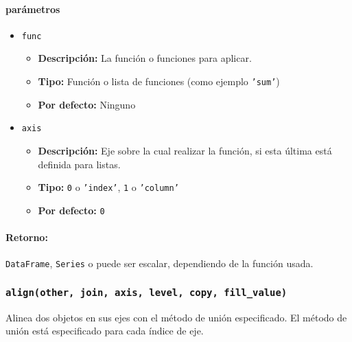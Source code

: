         \paragraph{\textbf{parámetros}}
        \begin{itemize}
            \item \texttt{func}
                \begin{itemize}
                    \item \textbf{Descripción:} La función o funciones para aplicar.
                    \item \textbf{Tipo:} Función o lista de funciones (como ejemplo \texttt{'sum'})
                    \item \textbf{Por defecto:} Ninguno
                \end{itemize}
            \item \texttt{axis}
                \begin{itemize}
                    \item \textbf{Descripción:} Eje sobre la cual realizar la función, si esta última está definida para listas.
                    \item \textbf{Tipo:} \texttt{0} o \texttt{'index'}, \texttt{1} o \texttt{'column'}
                    \item \textbf{Por defecto:} \texttt{0}
                \end{itemize}
        \end{itemize}
        \paragraph{Retorno:} \texttt{DataFrame}, \texttt{Series} o puede ser escalar, dependiendo de la función usada.


        \subsubsection{\texttt{align(other, join, axis, level, copy, fill\_value)}}
        Alinea dos objetos en sus ejes con el método de unión especificado. El método de unión está especificado para cada índice de eje.

